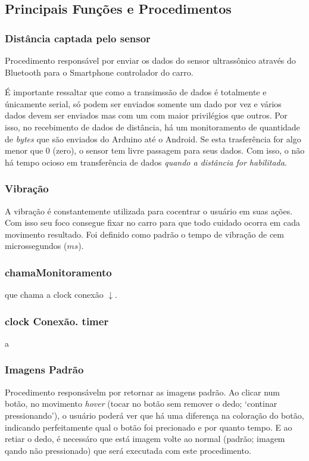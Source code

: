 \documentclass[portugues, brazil, a4paper,12pt]{article}
\begin{document}
\subsection{Principais Funções e Procedimentos}
\subsubsection{Distância captada pelo sensor}
Procedimento responsável por enviar os dados do sensor ultrassônico através do Bluetooth para o Smartphone controlador do carro.

É importante ressaltar que como a transimssão de dados é totalmente e únicamente serial, só podem ser enviados somente um dado por vez e vários dados devem ser enviados mas com um com maior privilégios que outros. Por isso, no recebimento de dados de distância, há um monitoramento de quantidade de \textit{bytes} que são enviados do Arduino até o Android. Se esta trasferência for algo menor que 0 (zero), o sensor tem livre passagem para seus dados. Com isso, o não há tempo ocioso em transferência de dados \textit{quando a distância for habilitada}.

\subsubsection{Vibração}
A vibração é constantemente utilizada para cocentrar o usuário em suas ações. Com isso seu foco consegue fixar no carro para que todo cuidado ocorra em cada movimento resultado. Foi definido como padrão o tempo de vibração de cem microssegundos ($ms$).

\subsubsection{chamaMonitoramento} 

que chama a clock conexão $\downarrow$.

\subsubsection{clock Conexão. timer}
a

\subsubsection{Imagens Padrão}
Procedimento responsávelm por retornar as imagens padrão. Ao clicar num botão, no movimento \textit{hover} (tocar no botão sem remover o dedo; `continar pressionando'), o usuário poderá ver que há uma diferença na coloração do botão, indicando perfeitamente qual o botão foi precionado e por quanto tempo. E ao retiar o dedo, é necessáro que está imagem volte ao normal (padrão; imagem qando não pressionado) que será executada com este procedimento.
\end{document}

